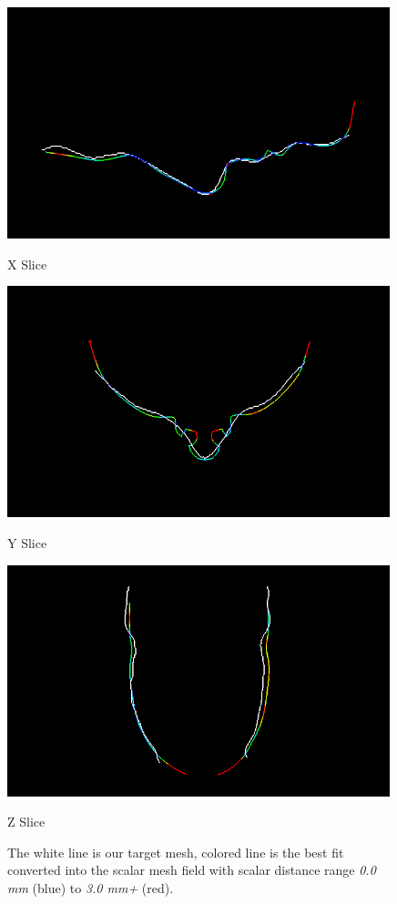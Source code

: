 \begin{figure}
  \centering    
  \begin{minipage}{.325\textwidth}
    \centering
    \includegraphics[width=0.99\textwidth]{Figures/Pictures/sfX.png}
    \caption*{X Slice}
  \end{minipage}
  \begin{minipage}{.325\textwidth}
    \centering
    \includegraphics[width=0.99\textwidth]{Figures/Pictures/sfY.png}
    \caption*{Y Slice}
  \end{minipage}
  \begin{minipage}{.325\textwidth}
    \centering
    \includegraphics[width=0.99\textwidth]{Figures/Pictures/sfZ.png}
    \caption*{Z Slice}
  \end{minipage}
  \caption{The white line is our target mesh, colored line is the best fit converted into the scalar mesh field with scalar distance range \textit{0.0 mm} (blue) to \textit{3.0 mm+} (red).}
  \label{f3.15}
\end{figure}

